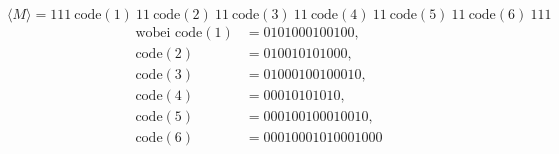 \[
	\langle M \rangle = 111\ \text{code}(1)\ 11\ \text{code}(2)\ 11\ \text{code}(3)\ 11\ 
	\text{code}(4)\ 11\ \text{code}(5)\ 11\ \text{code}(6)\ 111
\]
\begin{align*}
	\text{wobei }
	\text{code}(1) &= 0101000100100,\\
	\text{code}(2) &= 010010101000,\\
	\text{code}(3) &= 01000100100010,\\
	\text{code}(4) &= 00010101010,\\
	\text{code}(5) &= 000100100010010,\\
	\text{code}(6) &= 00010001010001000
\end{align*}
